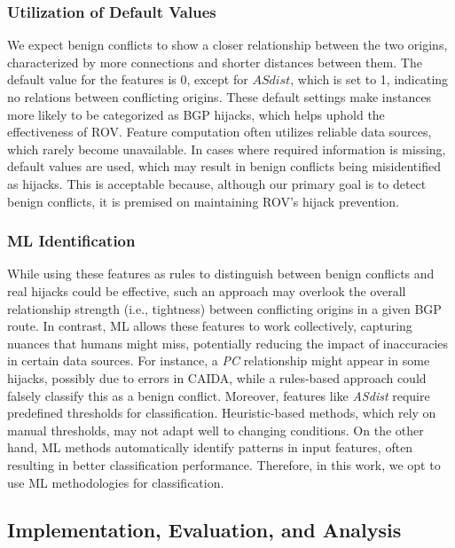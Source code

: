 \subsubsection{Utilization of Default Values}
We expect benign conflicts to show a closer relationship between the two origins, characterized by more connections and shorter distances between them.
The default value for the features is 0, except for $ASdist$, which is set to 1, indicating no relations between conflicting origins. These default settings make instances more likely to be categorized as BGP hijacks, which helps uphold the effectiveness of ROV. Feature computation often utilizes reliable data sources, which rarely become unavailable.
In cases where required information is missing, default values are used, which may result in benign conflicts being misidentified as hijacks. This is acceptable because, although our primary goal is to detect benign conflicts, it is premised on maintaining ROV's hijack prevention.
\vspace{-10pt}
\subsubsection{ML Identification}
While using these features as rules to distinguish between benign conflicts and real hijacks could be effective, such an approach may overlook the overall relationship strength (i.e., tightness) between conflicting origins in a given BGP route. In contrast, ML allows these features to work collectively, capturing nuances that humans might miss, potentially reducing the impact of inaccuracies in certain data sources. For instance, a \textit{PC} relationship might appear in some hijacks, possibly due to errors in CAIDA, while a rules-based approach could falsely classify this as a benign conflict. Moreover, features like \textit{ASdist} require predefined thresholds for classification. Heuristic-based methods, which rely on manual thresholds, may not adapt well to changing conditions. On the other hand, ML methods automatically identify patterns in input features, often resulting in better classification performance. Therefore, in this work, we opt to use ML methodologies for classification.



\vspace{-5pt}
\subsection{Implementation, Evaluation, and Analysis} \label{subsec:groundtruth}

